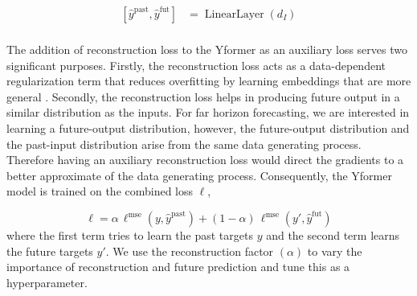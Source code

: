 \begin{equation}
    \begin{aligned}
        {[\hat{y}^{\text{past}}, \hat{y}^{\text{fut}}]} &= \operatorname{LinearLayer} (d_I) \\
    \end{aligned}
    \label{eqn:prediction}
\end{equation}

The addition of reconstruction loss to the Yformer as an auxiliary loss serves two significant purposes. Firstly, the reconstruction loss acts as a data-dependent regularization term that reduces overfitting by learning embeddings that are more general \cite{Jarrett2020Target-Embedding}. Secondly, the reconstruction loss helps in producing future output in a similar distribution as the inputs. For far horizon forecasting, we are interested in learning a future-output distribution, however, the future-output distribution and the past-input distribution arise from the same data generating process. Therefore having an auxiliary reconstruction loss would direct the gradients to a better approximate of the data generating process. Consequently, the Yformer model is trained on the combined loss $\ell$, 

\begin{equation}
    \ell = \alpha \, \ell^{\text{mse}}(y, \hat{y}^{\text{past}}) + (1-\alpha) \, \ell^{\text{mse}}(y', \hat{y}^{\text{fut}}) 
    \label{eqn:reconstruction}
\end{equation}
where the first term tries to learn the past targets $y$ and the second term learns the future targets $y'$. We use the reconstruction factor $(\alpha)$ to vary the importance of reconstruction and future prediction and tune this as a hyperparameter. 
